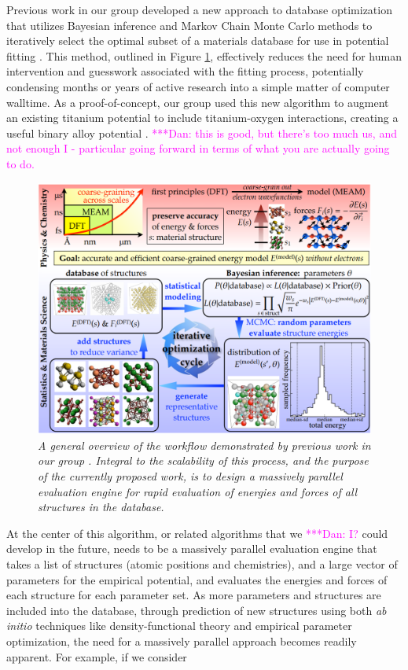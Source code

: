 \documentclass{article}
\newcommand{\katznote}[1]{ {\textcolor{magenta}    { ***Dan:      #1 }}}
\begin{document}
Previous work in our group developed a new approach to database optimization that utilizes Bayesian inference \cite{baye} and Markov Chain Monte Carlo methods to iteratively select the optimal subset of a materials database for use in potential fitting \cite{dbopt}. This method, outlined in Figure \ref{fig:workflow}, effectively reduces the need for human intervention and guesswork associated with the fitting process, potentially condensing months or years of active research into a simple matter of computer walltime. As a proof-of-concept, our group used this new algorithm to augment an existing titanium potential to include titanium-oxygen interactions, creating a useful binary alloy potential \cite{tio}. \katznote{this is good, but there's too much us, and not enough I - particular going forward in terms of what you are actually going to do.}

\begin{figure}[h!]
  \centering
  \includegraphics[width=0.65\linewidth]{workflow.png}
  \caption{\textit{A general overview of the workflow demonstrated by previous work in our group \cite{dbopt}. Integral to the scalability of this process, and the purpose of the currently proposed work, is to design a massively parallel evaluation engine for rapid evaluation of energies and forces of all structures in the database.}}
  \label{fig:workflow}
\end{figure}

At the center of this algorithm, or related algorithms that we \katznote{I?} could develop in the future, needs to be a massively parallel evaluation engine that takes a list of structures (atomic positions and chemistries), and a large vector of parameters for the empirical potential, and evaluates the energies and forces of each structure for each parameter set. As more parameters and structures are included into the database, through prediction of new structures using both \textit{ab initio} techniques like density-functional theory and empirical parameter optimization, the need for a massively parallel approach becomes readily apparent. For example, if we consider
\end{document}
